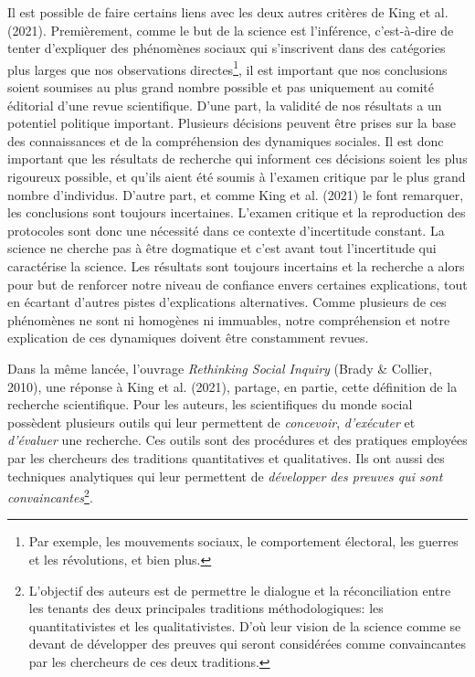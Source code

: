 \documentclass[
  letterpaper,
  DIV=11,
  numbers=noendperiod,
  oneside]{scrreprt}
\begin{document}
Il est possible de faire certains liens avec les deux autres critères de
King et al. (2021). Premièrement, comme le but de la science est
l'inférence, c'est-à-dire de tenter d'expliquer des phénomènes sociaux
qui s'inscrivent dans des catégories plus larges que nos observations
directes\footnote{Par exemple, les mouvements sociaux, le comportement
  électoral, les guerres et les révolutions, et bien plus.}, il est
important que nos conclusions soient soumises au plus grand nombre
possible et pas uniquement au comité éditorial d'une revue scientifique.
D'une part, la validité de nos résultats a un potentiel politique
important. Plusieurs décisions peuvent être prises sur la base des
connaissances et de la compréhension des dynamiques sociales. Il est
donc important que les résultats de recherche qui informent ces
décisions soient les plus rigoureux possible, et qu'ils aient été soumis
à l'examen critique par le plus grand nombre d'individus. D'autre part,
et comme King et al. (2021) le font remarquer, les conclusions sont
toujours incertaines. L'examen critique et la reproduction des
protocoles sont donc une nécessité dans ce contexte d'incertitude
constant. La science ne cherche pas à être dogmatique et c'est avant
tout l'incertitude qui caractérise la science. Les résultats sont
toujours incertains et la recherche a alors pour but de renforcer notre
niveau de confiance envers certaines explications, tout en écartant
d'autres pistes d'explications alternatives. Comme plusieurs de ces
phénomènes ne sont ni homogènes ni immuables, notre compréhension et
notre explication de ces dynamiques doivent être constamment revues.

Dans la même lancée, l'ouvrage \emph{Rethinking Social Inquiry} (Brady
\& Collier, 2010), une réponse à King et al. (2021), partage, en partie,
cette définition de la recherche scientifique. Pour les auteurs, les
scientifiques du monde social possèdent plusieurs outils qui leur
permettent de \emph{concevoir}, \emph{d'exécuter} et \emph{d'évaluer}
une recherche. Ces outils sont des procédures et des pratiques employées
par les chercheurs des traditions quantitatives et qualitatives. Ils ont
aussi des techniques analytiques qui leur permettent de \emph{développer
des preuves qui sont convaincantes}\footnote{L'objectif des auteurs est
  de permettre le dialogue et la réconciliation entre les tenants des
  deux principales traditions méthodologiques: les quantitativistes et
  les qualitativistes. D'où leur vision de la science comme se devant de
  développer des preuves qui seront considérées comme convaincantes par
  les chercheurs de ces deux traditions.}.
\end{document}
